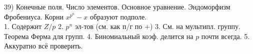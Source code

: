 39) Конечные поля. Число элементов. Основное уравнение. Эндоморфизм Фробениуса. Корни $x^{p^n} - x$ образуют подполе.\\
1. Содержит $Z/p$ 2. $p^n$ эл-тов (см. как п/г по $+$) 3. См. на мультипл. группу. Теорема Ферма для групп. 4. Биномиальный коэф. делится на $p$ почти всегда. 5. Аккуратно всё проверить.\\
